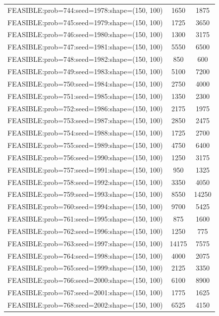 \begin{longtable}{lcc}
FEASIBLE:prob=744:seed=1978:shape=(150, 100) &     1650 &  1875 \\
FEASIBLE:prob=745:seed=1979:shape=(150, 100) &     1725 &  3650 \\
FEASIBLE:prob=746:seed=1980:shape=(150, 100) &     1300 &  3175 \\
FEASIBLE:prob=747:seed=1981:shape=(150, 100) &     5550 &  6500 \\
FEASIBLE:prob=748:seed=1982:shape=(150, 100) &      850 &   600 \\
FEASIBLE:prob=749:seed=1983:shape=(150, 100) &     5100 &  7200 \\
FEASIBLE:prob=750:seed=1984:shape=(150, 100) &     2750 &  4000 \\
FEASIBLE:prob=751:seed=1985:shape=(150, 100) &     1350 &  2300 \\
FEASIBLE:prob=752:seed=1986:shape=(150, 100) &     2175 &  1975 \\
FEASIBLE:prob=753:seed=1987:shape=(150, 100) &     2850 &  2475 \\
FEASIBLE:prob=754:seed=1988:shape=(150, 100) &     1725 &  2700 \\
FEASIBLE:prob=755:seed=1989:shape=(150, 100) &     4750 &  6400 \\
FEASIBLE:prob=756:seed=1990:shape=(150, 100) &     1250 &  3175 \\
FEASIBLE:prob=757:seed=1991:shape=(150, 100) &      950 &  1325 \\
FEASIBLE:prob=758:seed=1992:shape=(150, 100) &     3350 &  4050 \\
FEASIBLE:prob=759:seed=1993:shape=(150, 100) &     8550 & 14250 \\
FEASIBLE:prob=760:seed=1994:shape=(150, 100) &     9700 &  5425 \\
FEASIBLE:prob=761:seed=1995:shape=(150, 100) &      875 &  1600 \\
FEASIBLE:prob=762:seed=1996:shape=(150, 100) &     1250 &   775 \\
FEASIBLE:prob=763:seed=1997:shape=(150, 100) &    14175 &  7575 \\
FEASIBLE:prob=764:seed=1998:shape=(150, 100) &     4000 &  2075 \\
FEASIBLE:prob=765:seed=1999:shape=(150, 100) &     2125 &  3350 \\
FEASIBLE:prob=766:seed=2000:shape=(150, 100) &     6100 &  8900 \\
FEASIBLE:prob=767:seed=2001:shape=(150, 100) &     1775 &  1625 \\
FEASIBLE:prob=768:seed=2002:shape=(150, 100) &     6525 &  4150 \\

\end{longtable}
